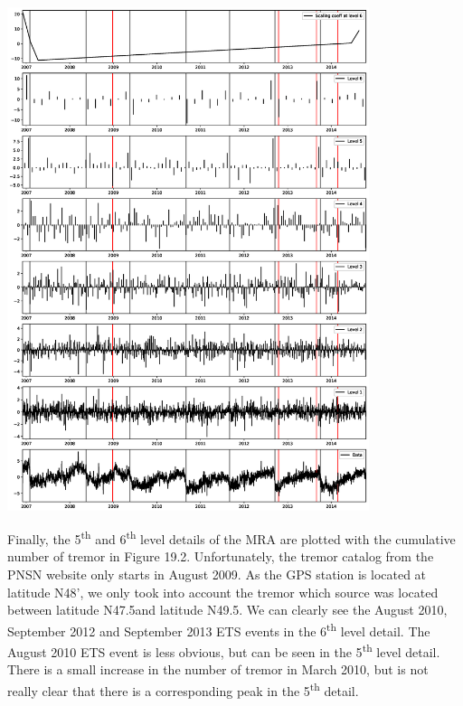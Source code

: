 \documentclass[main.tex]{subfiles}
\begin{document}
\begin{center}
\includegraphics[width=300pt]{Figures/slowslip_results/Figure_1.eps}
\captionsetup{type=figure}
\end{center}

Finally, the 5\textsuperscript{th} and 6\textsuperscript{th} level details of the MRA are plotted with the cumulative number of tremor in Figure 19.2. Unfortunately, the tremor catalog from the PNSN website only starts in August 2009. As the GPS station is located at latitude N48', we only took into account the tremor which source was located between latitude N47.5\degree and latitude N49.5\degree. We can clearly see the August 2010, September 2012 and September 2013 ETS events in the 6\textsuperscript{th} level detail. The August 2010 ETS event is less obvious, but can be seen in the 5\textsuperscript{th} level detail. There is a small increase in the number of tremor in March 2010, but is not really clear that there is a corresponding peak in the 5\textsuperscript{th} detail.
\end{document}
